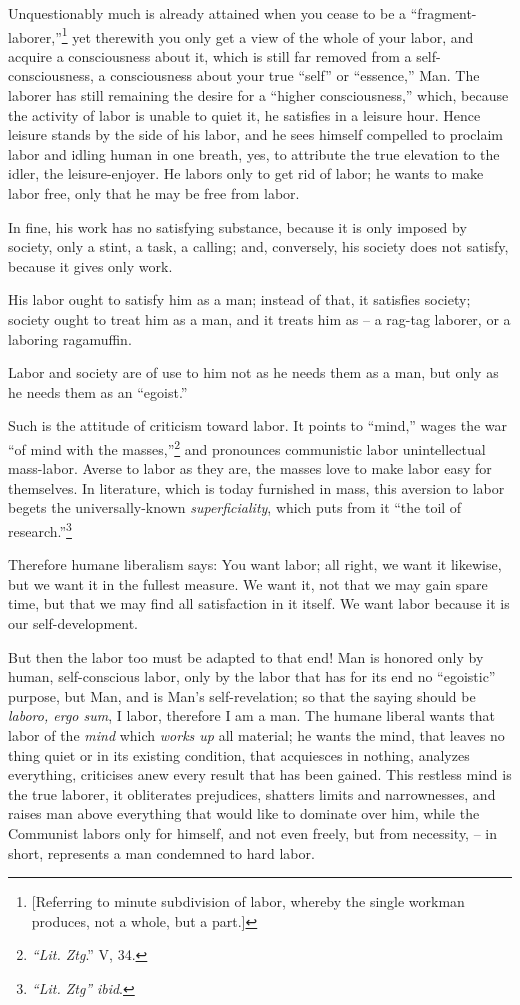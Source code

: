 \documentclass[12pt,a4paper]{book}
\begin{document}
Unquestionably much is already attained when you cease to be a 
``fragment-laborer,''\footnote{[Referring to minute subdivision of labor, 
whereby the single workman produces, not a whole, but a part.]} yet therewith 
you only get a view of the whole of your labor, and acquire a consciousness 
about it, which is still far removed from a self-consciousness, a 
consciousness about your true ``self'' or ``essence,'' Man. The laborer 
has still remaining the desire for a ``higher consciousness,'' which, 
because the activity of labor is unable to quiet it, he satisfies in a leisure 
hour. Hence leisure stands by the side of his labor, and he sees himself 
compelled to proclaim labor and idling human in one breath, yes, to attribute 
the true elevation to the idler, the leisure-enjoyer. He labors only to get 
rid of labor; he wants to make labor free, only that he may be free from 
labor.

In fine, his work has no satisfying substance, because it is only imposed by 
society, only a stint, a task, a calling; and, conversely, his society does 
not satisfy, because it gives only work.

His labor ought to satisfy him as a man; instead of that, it satisfies 
society; society ought to treat him as a man, and it treats him as -- a 
rag-tag laborer, or a laboring ragamuffin.

Labor and society are of use to him not as he needs them as a man, but only as 
he needs them as an ``egoist.''

Such is the attitude of criticism toward labor. It points to ``mind,'' wages 
the war ``of mind with the masses,''\footnote{\textit{``Lit. Ztg}.'' V, 
34.} and pronounces communistic labor unintellectual mass-labor. Averse to 
labor as they are, the masses love to make labor easy for themselves. In 
literature, which is today furnished in mass, this aversion to labor begets 
the universally-known \textit{superficiality}, which puts from it ``the toil 
of research.''\footnote{\textit{``Lit. Ztg''} \textit{ibid}.}

Therefore humane liberalism says: You want labor; all right, we want it 
likewise, but we want it in the fullest measure. We want it, not that we may 
gain spare time, but that we may find all satisfaction in it itself. We want 
labor because it is our self-development.

But then the labor too must be adapted to that end! Man is honored only by 
human, self-conscious labor, only by the labor that has for its end no 
``egoistic'' purpose, but Man, and is Man's self-revelation; so that the 
saying should be \textit{laboro, ergo sum}, I labor, therefore I am a man. The 
humane liberal wants that labor of the \textit{mind} which \textit{works up} 
all material; he wants the mind, that leaves no thing quiet or in its existing 
condition, that acquiesces in nothing, analyzes everything, criticises anew 
every result that has been gained. This restless mind is the true laborer, it 
obliterates prejudices, shatters limits and narrownesses, and raises man above 
everything that would like to dominate over him, while the Communist labors 
only for himself, and not even freely, but from necessity, -- in short, 
represents a man condemned to hard labor.
\end{document}

